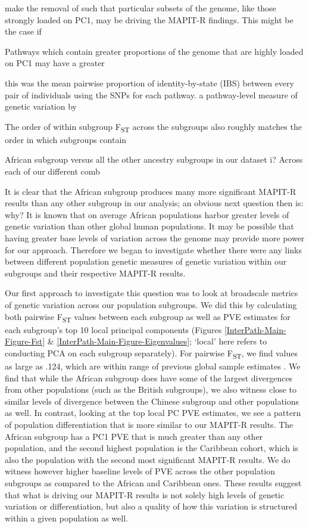 \documentclass[12pt,a4paper]{article}
\begin{document}
make the removal of  such that particular subsets of the genome, like those strongly loaded on PC1, may be driving the MAPIT-R findings. This might be the case if

Pathways which contain greater proportions of the genome that are highly loaded on PC1 may have a greater     

this was the mean pairwise proportion of identity-by-state (IBS) between every pair of individuals using the SNPs for each pathway. a pathway-level measure of genetic variation by 

The order of within subgroup F\textsubscript{ST} across the subgroups also roughly matches the order in which subgroups contain 

African subgroup versus all the other ancestry subgroups in our dataset i? Across each of our different comb





It is clear that the African subgroup produces many more significant MAPIT-R results than any other subgroup in our analysis; an obvious next question then is: why? It is known that on average African populations harbor greater levels of genetic variation than other global human populations. It may be possible that having greater base levels of variation across the genome may provide more power for our approach. Therefore we began to investigate whether there were any links between different population genetic measures of genetic variation within our subgroups and their respective MAPIT-R results.

Our first approach to investigate this question was to look at broadscale metrics of genetic variation across our population subgroups. We did this by calculating both pairwise F\textsubscript{ST} values between each subgroup as well as PVE estimates for each subgroup's top 10 local principal components (Figures \ref{InterPath-Main-Figure-Fst} \& \ref{InterPath-Main-Figure-Eigenvalues}; `local' here refers to conducting PCA on each subgroup separately). For pairwise F\textsubscript{ST}, we find values as large as .124, which are within range of previous global sample estimates \citep{Ramachandran2005,Weir2005,Wang2012,Sugden2016}. We find that while the African subgroup does have some of the largest divergences from other populations (such as the British subgroups), we also witness close to similar levels of divergence between the Chinese subgroup and other populations as well. In contrast, looking at the top local PC PVE estimates, we see a pattern of population differentiation that is more similar to our MAPIT-R results. The African subgroup has a PC1 PVE that is much greater than any other population, and the second highest population is the Caribbean cohort, which is also the population with the second most significant MAPIT-R results. We do witness however higher baseline levels of PVE across the other population subgroups as compared to the African and Caribbean ones. These results suggest that what is driving our MAPIT-R results is not solely high levels of genetic variation or differentiation, but also a quality of how this variation is structured within a given population as well.
\end{document}
